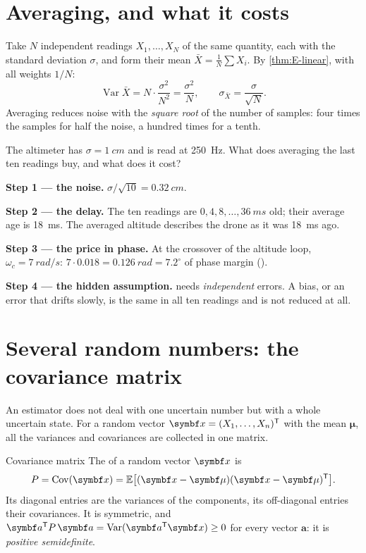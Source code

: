 \section{Averaging, and what it costs}

Take $N$ independent readings $X_1, \dots, X_N$ of the same quantity, each with the standard deviation $\sigma$, and form their mean $\bar X = \frac1N\sum X_i$. By \cref{thm:E-linear}, with all weights $1/N$:
\begin{equation}\label{eq:E-sqrtN}
  \operatorname{Var}\bar X = N \cdot \frac{\sigma^2}{N^2} = \frac{\sigma^2}{N}, \qquad \sigma_{\bar X} = \frac{\sigma}{\sqrt N} .
\end{equation}
Averaging reduces noise with the \emph{square root} of the number of samples: four times the samples for half the noise, a hundred times for a tenth.

\begin{example}
\label{ex:E-average}
The altimeter has $\sigma = \SI{1}{cm}$ and is read at \SI{250}{Hz}. What does averaging the last ten readings buy, and what does it cost?

\textbf{Step 1 — the noise.} $\sigma/\sqrt{10} = \SI{0.32}{cm}$.

\textbf{Step 2 — the delay.} The ten readings are $0, 4, 8, \dots, \SI{36}{ms}$ old; their average age is \SI{18}{ms}. The averaged altitude describes the drone as it was \SI{18}{ms} ago.

\textbf{Step 3 — the price in phase.} At the crossover of the altitude loop, $\omega_c = \SI{7}{rad/s}$: $7 \cdot 0.018 = \SI{0.126}{rad} = 7.2^\circ$ of phase margin ().

\textbf{Step 4 — the hidden assumption.}  needs \emph{independent} errors. A bias, or an error that drifts slowly, is the same in all ten readings and is not reduced at all.
\end{example}

\section{Several random numbers: the covariance matrix}

An estimator does not deal with one uncertain number but with a whole uncertain state. For a random vector $\vx = (X_1, \dots, X_n)^\T$ with the mean $\symbf\mu$, all the variances and covariances are collected in one matrix.

\begin{definition}{Covariance matrix}
The  of a random vector $\vx$ is
\begin{equation}
  P = \operatorname{Cov}(\vx) = \mathbb{E}\big[(\vx - \symbf\mu)(\vx - \symbf\mu)^\T\big] .
\end{equation}
Its diagonal entries are the variances of the components, its off-diagonal entries their covariances. It is symmetric, and $\symbf a^\T P\,\symbf a = \operatorname{Var}(\symbf a^\T\vx) \ge 0$ for every vector $\symbf a$: it is \emph{positive semidefinite}.
\end{definition}

